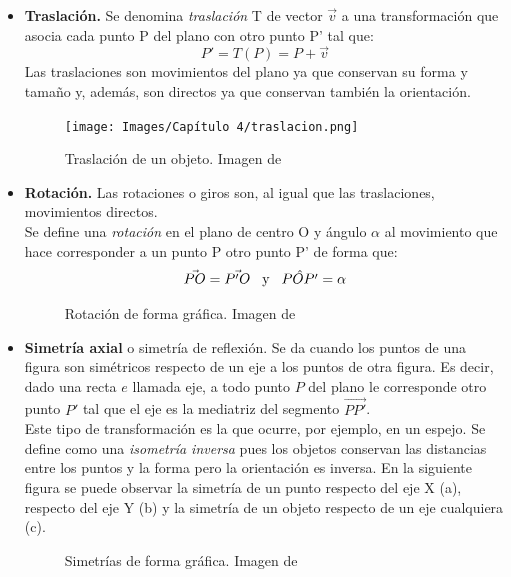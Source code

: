 \documentclass[a4paper, openright, 11pt, titlepage]{report}
\theoremstyle{definition}\newtheorem{defin}[propo]{Definition}
\theoremstyle{definition}\newtheorem{obser}[propo]{Remark}
\theoremstyle{definition}\newtheorem{ejem}[propo]{Ejemplo}
\theoremstyle{definition}\newtheorem{algoritmo}[propo]{Algoritmo}
\begin{document}
\begin{itemize}
    \item \textbf{Traslación.} Se denomina \textit{traslación} T de vector $\Vec{v}$ a una transformación que asocia cada punto P del plano con otro punto P' tal que: $$P' = T(P) = P + \Vec{v}$$
    Las traslaciones son movimientos del plano ya que conservan su forma y tamaño y, además, son directos ya que conservan también la orientación.
    \begin{figure}[H]
        \centering
        \texttt{[image: Images/Capítulo 4/traslacion.png]}
        \caption{Traslación de un objeto. Imagen de \cite{sangaku}}
    \end{figure}
    \item \textbf{Rotación.} Las rotaciones o giros son, al igual que las traslaciones, movimientos directos.\\
    Se define una \textit{rotación} en el plano de centro O y ángulo $\alpha$ al movimiento que hace corresponder a un punto P otro punto P' de forma que: 
    $$\Vec{PO} = \Vec{P'O} \hspace{0.3cm} \text{y} \hspace{0.3cm} \hat{POP'} = \alpha$$
        \begin{figure}[H]
            \centering
                \caption{Rotación de forma gráfica. Imagen de \cite{sangaku}}
        \end{figure}
    \item \textbf{Simetría axial} o simetría de reflexión. Se da cuando los puntos de una figura son simétricos respecto de un eje a los puntos de otra figura. Es decir, dado una recta $e$ llamada eje, a todo punto $P$ del plano le corresponde otro punto $P'$ tal que el eje es la mediatriz del segmento $\Vec{PP'}$.\\
    Este tipo de transformación es la que ocurre, por ejemplo, en un espejo. Se define como una \textit{isometría inversa} pues los objetos conservan las distancias entre los puntos y la forma pero la orientación es inversa. En la siguiente figura se puede observar la simetría de un punto respecto del eje X (a), respecto del eje Y (b) y la simetría de un objeto respecto de un eje cualquiera (c).
    \begin{figure}[H]
        \centering
         \hspace{0.5cm}
         \vspace{10mm}
        \caption{Simetrías de forma gráfica. Imagen de \cite{sangaku}}
        \end{figure}
\end{itemize}
\end{document}
